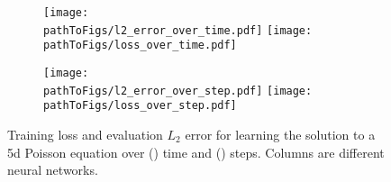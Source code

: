 \begin{figure}[!h]
  \centering
  \def\pathToFigs{kfac_pinns_exp/exp18_groupplot_poisson5d}
  \begin{subfigure}[t]{1.0\linewidth}
    \caption{}\label{subfig:poisson5d-time}
    \texttt{[image: \\pathToFigs/l2\_error\_over\_time.pdf]}
    \texttt{[image: \\pathToFigs/loss\_over\_time.pdf]}
  \end{subfigure}
  \begin{subfigure}[t]{1.0\linewidth}
    \caption{}\label{subfig:poisson5d-step}
    \texttt{[image: \\pathToFigs/l2\_error\_over\_step.pdf]}
    \texttt{[image: \\pathToFigs/loss\_over\_step.pdf]}
  \end{subfigure}
  \caption{Training loss and evaluation $L_2$ error for learning the solution to a 5d Poisson equation over () time and () steps.
    Columns are different neural networks.}\label{fig:poisson5d-appendix}
\end{figure}

